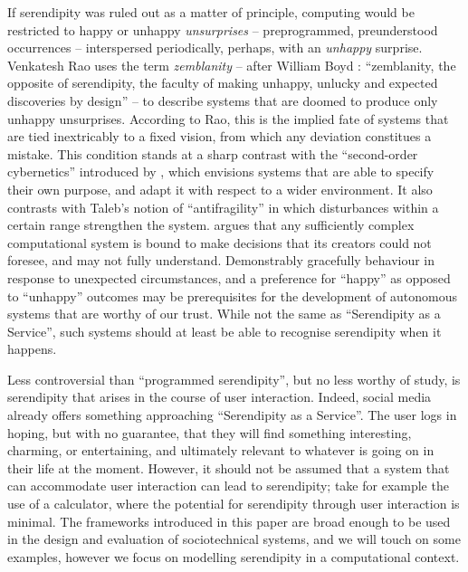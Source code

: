 If serendipity was ruled out as a matter of principle, computing would
be restricted to happy or unhappy \emph{unsurprises} -- preprogrammed,
preunderstood occurrences -- interspersed periodically, perhaps, with
an \emph{unhappy} surprise.  Venkatesh Rao
\citeyearpar{rao2015breaking} uses the term \emph{zemblanity} -- after
William Boyd \citeyearpar{boyd2010armadillo}: ``zemblanity, the
opposite of serendipity, the faculty of making unhappy, unlucky and
expected discoveries by design'' -- to describe systems that are
doomed to produce only unhappy unsurprises.  According to Rao, this is
the implied fate of systems that are tied inextricably to a fixed
vision, from which any deviation constitues a mistake.  This condition
stands at a sharp contrast with the ``second-order cybernetics''
introduced by , which envisions systems that
are able to specify their own purpose, and adapt it with respect to a
wider environment.  It also contrasts with Taleb's
\citeyearpar{taleb2012antifragile} notion of ``antifragility'' in
which disturbances within a certain range strengthen the system.
 argues that any sufficiently complex
computational system is bound to make decisions that its creators
could not foresee, and may not fully understand.  Demonstrably
gracefully behaviour in response to unexpected circumstances, and a
preference for ``happy'' as opposed to ``unhappy'' outcomes may be
prerequisites for the development of autonomous systems that are
worthy of our trust.  While not the same as ``Serendipity as a
Service'', such systems should at least be able to recognise
serendipity when it happens.

Less controversial than ``programmed serendipity'', but no less worthy
of study, is serendipity that arises in the course of user
interaction.  Indeed, social media already offers something
approaching ``Serendipity as a Service''.  The user logs in hoping,
but with no guarantee, that they will find something interesting,
charming, or entertaining, and ultimately relevant to whatever is
going on in their life at the moment.  However, it should not be
assumed that a system that can accommodate user interaction can lead
to serendipity; take for example the use of a calculator, where the
potential for serendipity through user interaction is minimal.  The
frameworks introduced in this paper are broad enough to be used in the
design and evaluation of sociotechnical systems, and we will touch on
some examples, however we focus on modelling serendipity in a
computational context.

